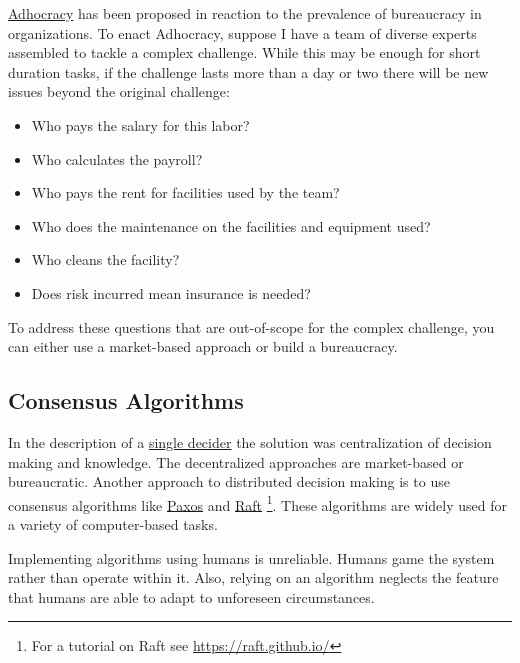 \href{https://en.wikipedia.org/wiki/Adhocracy}{Adhocracy} 
has been proposed in reaction to the prevalence of bureaucracy in organizations. To enact Adhocracy, suppose I have a team of diverse experts assembled to tackle a complex challenge.
While this may be enough for short duration tasks, if the challenge lasts more than a day or two there will be new issues beyond the original challenge:

\begin{itemize}
    \item Who pays the salary for this labor?
    \item Who calculates the payroll?
    \item Who pays the rent for facilities used by the team?
    \item Who does the maintenance on the facilities and equipment used?
    \item Who cleans the facility?
    \item Does risk incurred mean insurance is needed?
\end{itemize}
To address these questions that are out-of-scope for the complex challenge, you can either use a market-based approach or build a bureaucracy. 

\subsection*{Consensus Algorithms}

In the description of a \hyperref[sec:single-decider]{single decider}
the solution was centralization of decision making and knowledge. The decentralized approaches are market-based or bureaucratic. Another approach to distributed decision making is to use consensus algorithms like 
\href{https://en.wikipedia.org/wiki/Paxos_(computer_science)}{Paxos} and
\href{https://en.wikipedia.org/wiki/Raft_(algorithm)}{Raft}
\footnote{For a tutorial on Raft see \href{https://raft.github.io/}{https://raft.github.io/}}.
These algorithms are widely used for a variety of  computer-based tasks. 

Implementing algorithms using humans is unreliable. Humans game the system rather than operate within it. Also, relying on an algorithm neglects the feature that humans are able to adapt to unforeseen circumstances.

